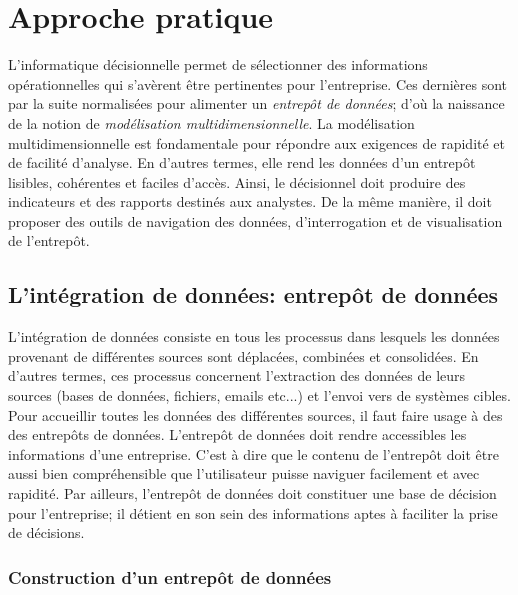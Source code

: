 \documentclass[12pt,a4wide,twoside]{report}
\begin{document}
\chapter{Approche pratique}
L'informatique décisionnelle permet de sélectionner des informations opérationnelles qui s'avèrent être pertinentes pour l'entreprise. Ces dernières sont par la suite normalisées pour alimenter un \emph{entrepôt de données}; d'où la naissance de la notion de \emph{modélisation multidimensionnelle}.\newline
La modélisation multidimensionnelle est fondamentale pour répondre aux exigences de rapidité et de facilité d'analyse. En d'autres termes, elle rend les données d'un entrepôt  lisibles, cohérentes et faciles d'accès.\newline
Ainsi, le décisionnel doit produire des indicateurs et des rapports destinés aux analystes. De la même manière, il doit proposer des outils de navigation des données, d'interrogation et de visualisation de l'entrepôt.
\section{L'intégration de données: entrepôt de données}
L'intégration de données consiste en tous les processus dans lesquels les données provenant de différentes sources sont déplacées, combinées et consolidées. En d'autres termes, ces processus concernent l'extraction des données de leurs sources (bases de données, fichiers, emails etc...) et l'envoi vers de systèmes cibles.\newline
Pour accueillir toutes les données des différentes sources, il faut faire usage à des des entrepôts de données. L'entrepôt de données doit rendre accessibles les informations d'une entreprise. C'est à dire que le contenu de l'entrepôt doit être aussi bien compréhensible que l'utilisateur puisse naviguer facilement et avec rapidité. \newline
Par ailleurs, l'entrepôt de données doit constituer une base de décision pour l'entreprise; il détient en son sein des informations aptes à faciliter la prise de décisions.\newline

\subsection{Construction d'un entrepôt de données}
\end{document}

